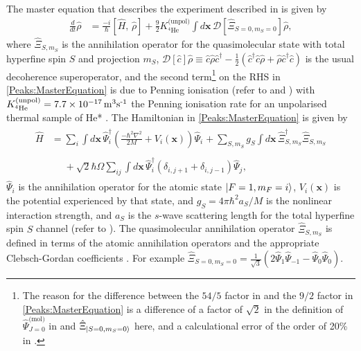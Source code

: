 The master equation that describes the experiment described in  is given by
\begin{align}
    \label{Peaks:MasterEquation}
    \frac{d }{d t}\hat{\rho} &= \frac{-i}{\hbar} [\hat{H},\, \hat{\rho} ] + \frac{9}{2} K^\text{(unpol)}_{^{4}\text{He}} \int d \bm{x}\, \mathcal{D}\left[\hat{\Xi}_{S=0,m_S=0} \right] \hat{\rho},
\end{align}
where $\displaystyle\hat{\Xi}_{S, m_S}$ is the annihilation operator for the quasimolecular state with total hyperfine spin $S$ and projection $m_S$, $\mathcal{D}[\hat{c}]\hat{\rho} \equiv \hat{c}\hat{\rho}\hat{c}^\dagger - \frac{1}{2}(\hat{c}^\dagger \hat{c} \hat{\rho} + \hat{\rho} \hat{c}^\dagger \hat{c})$ is the usual decoherence superoperator, and the second term\footnote{The reason for the difference between the ${54}/{5}$ factor in \citet{Dall:2009} and the $9/2$ factor in \eqref{Peaks:MasterEquation} is a difference of a factor of $\sqrt{2}$ in the definition of $\hat{\Psi}_{J=0}^{\text{(mol)}}$ in \citep{Dall:2009} and $\displaystyle\hat{\Xi}_{\left|S=0, m_S=0\right>}$ here, and a calculational error of the order of 20\% in \citep{Dall:2009}.} on the RHS in \eqref{Peaks:MasterEquation} is due to Penning ionisation (refer to  and ) with $K^\text{(unpol)}_{^{4}\text{He}}=\unit[7.7\times 10^{-17}]{m\textsuperscript{3}s\textsuperscript{-1}}$ the Penning ionisation rate for an unpolarised thermal sample of He* \citep{Stas:2006kx}. The Hamiltonian in \eqref{Peaks:MasterEquation} is given by
\begin{align}
    \label{Peaks:3DHamiltonian}
    \begin{split}
    \hat{H} &= \sum_i \int d\bm{x}\, \hat{\Psi}_i^\dagger \left(\frac{-\hbar^2 \nabla^2}{2 M} + V_i(\bm{x})\right)\hat{\Psi}_i^{\phantom{\dagger}} + \sum_{S, m_S} g_{S}\int d\bm{x}\, \hat{\Xi}_{S, m_S}^\dagger \hat{\Xi}_{S, m_S}^{\phantom{\dagger}}\\
    \\
            &\phantom{=} + \sqrt{2} \hbar \Omega \sum_{i j}\int d\bm{x}\, \hat{\Psi}_i^\dagger \left(\delta_{i, j+1} + \delta_{i, j-1}\right) \hat{\Psi}_j^{\phantom{\dagger}},
    \end{split}
\end{align}
$\displaystyle \hat{\Psi}_i$ is the annihilation operator for the atomic state $\displaystyle {\ensuremath{\left|F=1, m_F=i\right>}}$, $V_i(\bm{x})$ is the potential experienced by that state, and $g_S = 4 \pi \hbar^2 a_S/M$ is the nonlinear interaction strength, and $a_S$ is the $s$-wave scattering length for the total hyperfine spin $S$ channel (refer to ). The quasimolecular annihilation operator $\displaystyle \hat{\Xi}_{S, m_S}$ is defined in terms of the atomic annihilation operators and the appropriate Clebsch-Gordan coefficients \citep{Ho:1998}. For example $\displaystyle \hat{\Xi}_{S=0, m_S=0} = \frac{1}{\sqrt{3}} \left( 2 \hat{\Psi}_1 \hat{\Psi}_{-1} - \hat{\Psi}_0 \hat{\Psi}_0\right)$.

